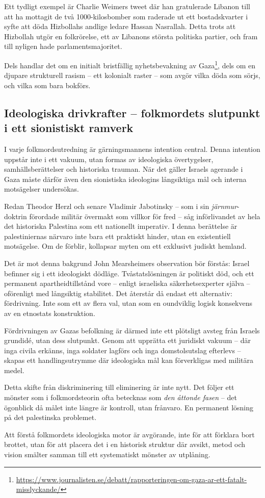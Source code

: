 Ett tydligt exempel är Charlie Weimers tweet där han gratulerade Libanon till att ha mottagit de två 1000-kilosbomber som raderade ut ett bostadskvarter i syfte att döda Hizbollahs andlige ledare Hassan Nasrallah. Detta trots att Hizbollah utgör en folkrörelse, ett av Libanons största politiska partier, och fram till nyligen hade parlamentsmajoritet.

Dels handlar det om en initialt bristfällig nyhetsbevakning av Gaza\footnote{\url{https://www.journalisten.se/debatt/rapporteringen-om-gaza-ar-ett-fatalt-misslyckande/}}, dels om en djupare strukturell rasism – ett kolonialt raster – som avgör vilka döda som sörjs, och vilka som bara bokförs.

\subsection{Ideologiska drivkrafter – folkmordets slutpunkt i ett sionistiskt ramverk}

I varje folkmordsutredning är gärningsmannens intention central. Denna intention uppstår inte i ett vakuum, utan formas av ideologiska övertygelser, samhällsberättelser och historiska trauman. När det gäller Israels agerande i Gaza måste därför även den sionistiska ideologins långsiktiga mål och interna motsägelser undersökas.

Redan Theodor Herzl och senare Vladimir Jabotinsky – som i sin \textit{järnmur}-doktrin förordade militär övermakt som villkor för fred – såg införlivandet av hela det historiska Palestina som ett nationellt imperativ. I denna berättelse är palestiniernas närvaro inte bara ett praktiskt hinder, utan en existentiell motsägelse. Om de förblir, kollapsar myten om ett exklusivt judiskt hemland.

Det är mot denna bakgrund John Mearsheimers observation bör förstås: Israel befinner sig i ett ideologiskt dödläge. Tvåstatslösningen är politiskt död, och ett permanent apartheidtillstånd vore – enligt israeliska säkerhetsexperter själva – oförenligt med långsiktig stabilitet. Det återstår då endast ett alternativ: fördrivning. Inte som ett av flera val, utan som en oundviklig logisk konsekvens av en etnostats konstruktion.

Fördrivningen av Gazas befolkning är därmed inte ett plötsligt avsteg från Israels grundidé, utan dess slutpunkt. Genom att upprätta ett juridiskt vakuum – där inga civila erkänns, inga soldater lagförs och inga domstolsutslag efterlevs – skapas ett handlingsutrymme där ideologiska mål kan förverkligas med militära medel.

Detta skifte från diskriminering till eliminering är inte nytt. Det följer ett mönster som i folkmordsteorin ofta betecknas som \textit{den åttonde fasen} – det ögonblick då målet inte längre är kontroll, utan frånvaro. En permanent lösning på det palestinska problemet.

Att förstå folkmordets ideologiska motor är avgörande, inte för att förklara bort brottet, utan för att placera det i en historisk struktur där avsikt, metod och vision smälter samman till ett systematiskt mönster av utplåning.

